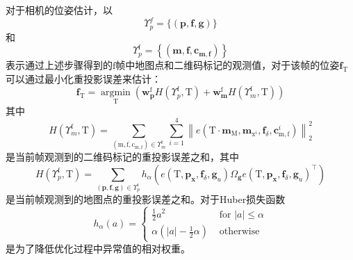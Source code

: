 对于相机的位姿估计，以
\begin{equation}
\Upsilon_{p}^{f}=\{(\mathbf{p}, \mathbf{f}, \mathbf{g})\}
\end{equation}
和
\begin{equation}
\Upsilon_{p}^{\mathrm{f}}=\left\{\left(\mathbf{m}, \mathbf{f}, \mathbf{c}_{\mathbf{m}, \mathbf{f}}\right)\right\}
\end{equation}
表示通过上述步骤得到的$\mathrm{f}$帧中地图点和二维码标记的观测值，对于该帧的位姿$\mathbf{f}_{\mathrm{T}}$可以通过最小化重投影误差来估计：
\begin{equation}
\mathbf{f}_{\mathrm{T}}=\underset{\mathrm{T}}{\operatorname{argmin}}\left(\mathbf{w}_{\mathbf{p}}^{\mathrm{f}} H\left(\Upsilon_{p}^{\mathrm{f}}, \mathrm{T}\right)+\mathbf{w}_{\mathbf{m}}^{\mathrm{f}} H\left(\Upsilon_{m}^{\mathrm{f}}, \mathrm{T}\right)\right)
\label{equ:weight}
\end{equation}
其中
\begin{equation}
H\left(\Upsilon_{m}^{\mathrm{f}}, \mathrm{T}\right)=\sum_{\left(\mathrm{m}, \mathrm{f}, \mathrm{c}_{\mathrm{m}, \mathrm{f}}\right) \in \Upsilon_{m}^{\mathrm{f}}} \sum_{i=1}^{4}\left\|e\left(\mathrm{T} \cdot \mathbf{m}_{\mathrm{M}}, \mathbf{m}_{\mathrm{x}^{i}}, \mathbf{f}_{\delta}, \mathbf{c}_{\mathrm{m}, \mathrm{f}}^{i}\right)\right\|_{2}^{2}
\end{equation}
是当前帧观测到的二维码标记的重投影误差之和，其中
\begin{equation}
H\left(\Upsilon_{p}^{\mathrm{f}}, \mathrm{T}\right)=\sum_{(\mathbf{p}, \mathbf{f}, \mathbf{g}) \in \Upsilon_{p}^{\epsilon}} h_{\alpha}\left(e\left(\mathrm{T}, \mathbf{p}_{\mathbf{x}}, \mathbf{f}_{\delta}, \mathbf{g}_{u}\right) \Omega_{\mathbf{g}} e\left(\mathrm{T}, \mathbf{p}_{\mathbf{x}}, \mathbf{f}_{\delta}, \mathbf{g}_{u}\right)^{\top}\right)
\end{equation}
是当前帧观测到的地图点的重投影误差之和。对于Huber损失函数
\begin{equation}
h_{\alpha}(a)=\left\{\begin{array}{ll}{\frac{1}{2} a^{2}} & {\text { for }|a| \leq \alpha} \\ {\alpha\left(|a|-\frac{1}{2} \alpha\right)} & {\text { otherwise }}\end{array}\right.
\end{equation}
是为了降低优化过程中异常值的相对权重。

